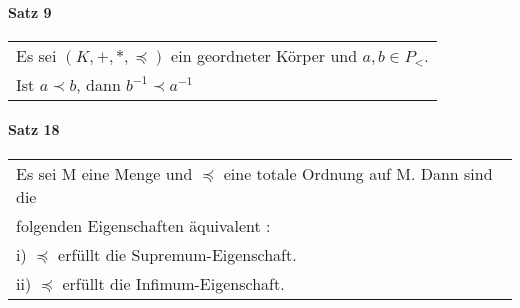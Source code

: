 \documentclass[a4paper]{scrartcl}
\begin{document}
\paragraph{Satz 9}
\begin{tabbing}
\begin{tabular}{l}
Es sei $(K,+,*,\preceq)$ ein geordneter Körper und $a,b\in P_<$.\\
Ist $a\prec b$, dann $b^{-1} \prec a^{-1}$
\end{tabular}
\end{tabbing}










\paragraph{Satz 18}
\begin{tabbing}
\begin{tabular}{l}
Es sei M eine Menge und $ \preceq $ eine totale Ordnung auf M. Dann sind die\\
folgenden Eigenschaften äquivalent : \\
i) $ \preceq $ erfüllt die Supremum-Eigenschaft.\\
ii) $ \preceq $ erfüllt die Infimum-Eigenschaft.
\end{tabular}
\end{tabbing}
\end{document}
